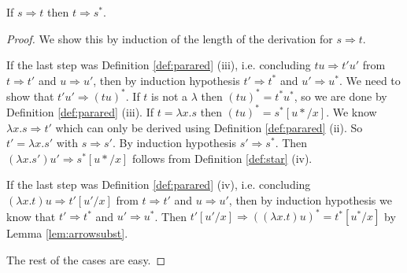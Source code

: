 \begin{boxlem} \label{lem:arrowstar}
    If $s \Rightarrow t$ then $t \Rightarrow s^*$.
\end{boxlem}
\begin{proof}
    We show this by induction of the length of the derivation for $s \Rightarrow t$.

    If the last step was Definition \ref{def:parared} (iii), i.e. concluding $tu \Rightarrow t'u'$ from $t \Rightarrow t'$ and $u \Rightarrow u'$, then by induction hypothesis $t' \Rightarrow t^*$ and $u' \Rightarrow u^*$.
    We need to show that $t'u' \Rightarrow (t u)^*$.
    If $t$ is not a $\lambda$ then $(tu)^* = t^*u^*$, so we are done by Definition \ref{def:parared} (iii).
    If $t = \lambda x. s$ then $(tu)^* = s^* [u*/x]$.
    We know $\lambda x.s \Rightarrow t'$ which can only be derived using Definition \ref{def:parared} (ii). 
    So $t' = \lambda x. s'$ with $s \Rightarrow s'$.
    By induction hypothesis $s' \Rightarrow s^*$. 
    Then $(\lambda x. s') u' \Rightarrow s^* [u*/x]$ follows from Definition \ref{def:star} (iv).

    If the last step was Definition \ref{def:parared} (iv), i.e. concluding $(\lambda x.t) u \Rightarrow t'[u'/x]$ from $t \Rightarrow t'$ and $u \Rightarrow u'$, then by induction hypothesis we know that $t' \Rightarrow t^*$ and $u' \Rightarrow u^*$.
    Then $t'[u'/x] \Rightarrow ((\lambda x.t)u)^* = t^*[u^* /x]$ by Lemma \ref{lem:arrowsubst}.

    The rest of the cases are easy.
\end{proof}

